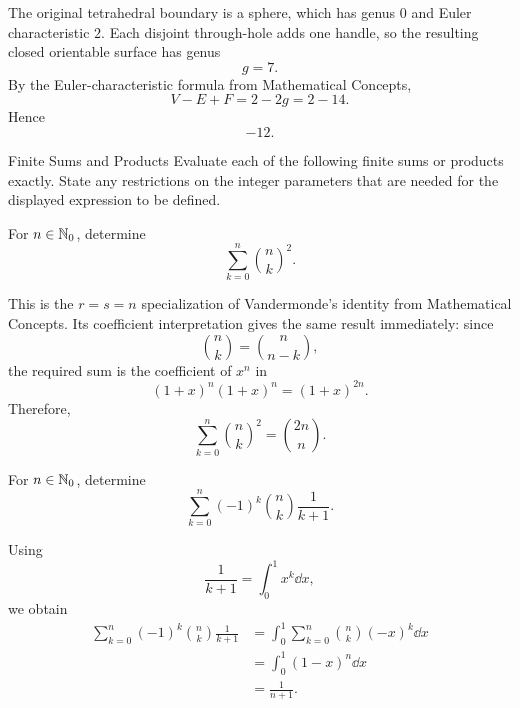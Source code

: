     \begin{solution}
        The original tetrahedral boundary is a sphere, which has genus $0$ and
        Euler characteristic $2$. Each disjoint through-hole adds one handle,
        so the resulting closed orientable surface has genus
        \[
            g=7.
        \]
        By the Euler-characteristic formula from Mathematical Concepts,
        \[
            V-E+F=2-2g=2-14.
        \]
        Hence
        \[
            \boxed{-12}.
        \]
    \end{solution}


    \begin{expectedproblemgroup}{Finite Sums and Products}
        Evaluate each of the following finite sums or products exactly. State any
        restrictions on the integer parameters that are needed for the displayed
        expression to be defined.

        \begin{expectedsubproblem}
            For $n\in\mathbb{N}_0$, determine
            \[
                \sum_{k=0}^{n}\binom{n}{k}^2.
            \]
        \end{expectedsubproblem}

        \begin{expectedsubsolution}
            This is the $r=s=n$ specialization of Vandermonde's identity from
            Mathematical Concepts. Its coefficient interpretation gives the
            same result immediately: since
            \[
                \binom{n}{k}=\binom{n}{n-k},
            \]
            the required sum is the coefficient of $x^n$ in
            \[
                (1+x)^n(1+x)^n=(1+x)^{2n}.
            \]
            Therefore,
            \[
                \boxed{
                    \sum_{k=0}^{n}\binom{n}{k}^2=\binom{2n}{n}
                }.
            \]
        \end{expectedsubsolution}

        \begin{expectedsubproblem}
            For $n\in\mathbb{N}_0$, determine
            \[
                \sum_{k=0}^{n}
                (-1)^k\binom{n}{k}\frac{1}{k+1}.
            \]
        \end{expectedsubproblem}

        \begin{expectedsubsolution}
            Using
            \[
                \frac{1}{k+1}=\int_0^1x^k\dd x,
            \]
            we obtain
            \[
                \begin{aligned}
                    \sum_{k=0}^{n}
                    (-1)^k\binom{n}{k}\frac{1}{k+1}
                    &=
                    \int_0^1
                    \sum_{k=0}^{n}\binom{n}{k}(-x)^k\dd x\\
                    &=
                    \int_0^1(1-x)^n\dd x\\
                    &=
                    \boxed{\frac{1}{n+1}}.
                \end{aligned}
            \]
        \end{expectedsubsolution}


\end{expectedproblemgroup}
